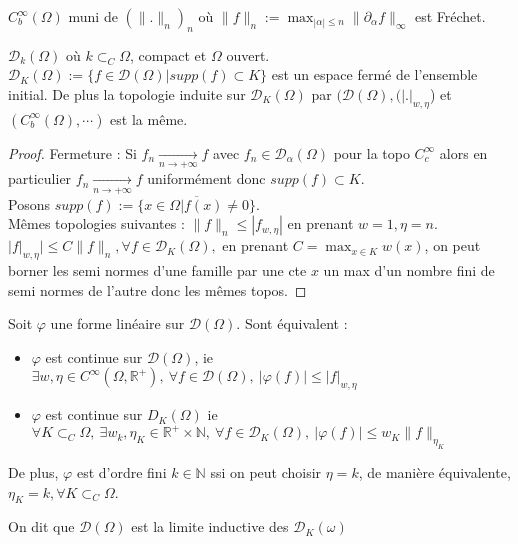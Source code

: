 \begin{ex}
    $C^\infty _b(\Omega)$ muni de $(\|.\|_n)_n$   où $\|f\|_n:=\max_{|\alpha |\le n}\|\partial _\alpha f\|_{\infty }$ est Fréchet.
\end{ex}
\begin{proposition}
    $\mathcal{D}_k(\Omega)$   où $k\subset _C\Omega$, compact et $\Omega$  ouvert. $\mathcal{D}_K(\Omega):=\{f\in \mathcal{D}(\Omega)|supp(f)\subset K\} $  est un espace fermé de l'ensemble initial. De plus la topologie induite sur $\mathcal{D}_K(\Omega)$ par $(\mathcal{D}(\Omega),(|.|_{w, \eta}$) et $(C^\infty _b(\Omega),\cdots)$ est la même.
\end{proposition}
\begin{proof}
    Fermeture : Si $f_n \xrightarrow[n\to +\infty]{} f$ avec $f_n\in \mathcal{D}_\alpha (\Omega)$ pour la topo $C^\infty _c$ alors en particulier $f_n \xrightarrow[n\to +\infty]{} f$ uniformément donc $supp(f)\subset K$.\\
    Posons $supp(f):=\overline{\{x\in \Omega|f(x)\neq 0\}}$.\\
    Mêmes topologies suivantes : $\|f\|_n\le |f_{w, \eta}|$ en prenant $w=1, \eta=n$. $|f|_{w, \eta}|\le C\|f\|_n, \forall f\in \mathcal{D}_K(\Omega),$ en prenant $C=\max_{x\in K}w(x)$, on peut borner les semi normes d'une famille par une cte $x$ un max d'un nombre fini de semi normes de l'autre donc les mêmes topos.
\end{proof}
\begin{proposition}
    Soit $\varphi $  une forme linéaire sur $\mathcal{D}(\Omega)$. Sont équivalent :
    \begin{itemize}
        \item $\varphi $  est continue sur $\mathcal{D}(\Omega)$, ie $\exists w, \eta\in C^\infty (\Omega,\mathbb{R} ^+),\ \forall f\in \mathcal{D}(\Omega),\ |\varphi (f)|\le |f|_{w, \eta} $
        \item $\varphi $  est continue sur $D_K(\Omega)$  ie $\forall K\subset _C\Omega,\ \exists w_k, \eta_K\in \mathbb{R} ^+\times \mathbb{N} ,\ \forall f\in \mathcal{D}_K(\Omega),\ |\varphi (f)|\le w_K\|f\|_{\eta_K}  $
    \end{itemize}
    De plus, $\varphi $  est d'ordre fini $k\in \mathbb{N} $  ssi on peut choisir $\eta=k$, de manière équivalente, $\eta_K=k,\forall K\subset _C\Omega $.
\end{proposition}
\begin{remarque}
    On dit que $\mathcal{D}(\Omega)$ est la limite inductive des $\mathcal{D}_K(\omega)$
\end{remarque}

